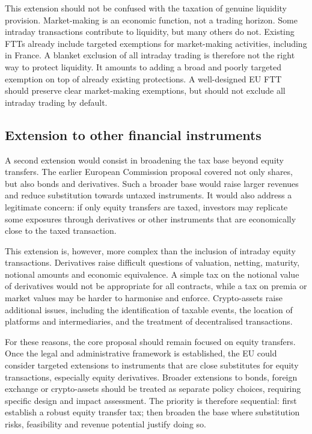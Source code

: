 \documentclass[../../main]{subfiles}
\begin{document}
This extension should not be confused with the taxation of genuine liquidity provision. Market-making is an economic function, not a trading horizon. Some intraday transactions contribute to liquidity, but many others do not. Existing FTTs already include targeted exemptions for market-making activities, including in France. A blanket exclusion of all intraday trading is therefore not the right way to protect liquidity. It amounts to adding a broad and poorly targeted exemption on top of already existing protections. A well-designed EU FTT should preserve clear market-making exemptions, but should not exclude all intraday trading by default.

\subsection{Extension to other financial instruments}

A second extension would consist in broadening the tax base beyond equity transfers. The earlier European Commission proposal covered not only shares, but also bonds and derivatives. Such a broader base would raise larger revenues and reduce substitution towards untaxed instruments. It would also address a legitimate concern: if only equity transfers are taxed, investors may replicate some exposures through derivatives or other instruments that are economically close to the taxed transaction.

This extension is, however, more complex than the inclusion of intraday equity transactions. Derivatives raise difficult questions of valuation, netting, maturity, notional amounts and economic equivalence. A simple tax on the notional value of derivatives would not be appropriate for all contracts, while a tax on premia or market values may be harder to harmonise and enforce. Crypto-assets raise additional issues, including the identification of taxable events, the location of platforms and intermediaries, and the treatment of decentralised transactions.

For these reasons, the core proposal should remain focused on equity transfers. Once the legal and administrative framework is established, the EU could consider targeted extensions to instruments that are close substitutes for equity transactions, especially equity derivatives. Broader extensions to bonds, foreign exchange or crypto-assets should be treated as separate policy choices, requiring specific design and impact assessment. The priority is therefore sequential: first establish a robust equity transfer tax; then broaden the base where substitution risks, feasibility and revenue potential justify doing so.





\end{document}

